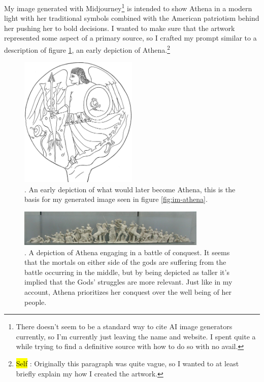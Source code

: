 \documentclass[letterpaper, reqno,11pt]{article}
\newcommand{\hlc}[2][yellow]{{%
    \colorlet{foo}{#1}%
    \sethlcolor{foo}\hl{#2}}%
}
\begin{document}
My image generated with Midjourney\autocite{midjourney}\footnote{There doesn't seem to be a standard way to cite AI image generators currently, so I'm currently just leaving the name and website. I spent quite a while trying to find a definitive source with how to do so with no avail. } is intended to show Athena in a modern light with her traditional symbols combined with the American patriotism behind her pushing her to bold decisions. I wanted to make sure that the artwork represented some aspect of a primary source, so I crafted my prompt similar to a description of figure \ref{fig:minerva}\autocite{minerva}, an early depiction of Athena.\footnote{\hlc[pink]{Self}: Originally this paragraph was quite vague, so I wanted to at least briefly explain my how I created the artwork.}

\begin{figure}[htpb]
  \centering
  \includegraphics[width=0.5\textwidth]{minerva}
  \caption{\cite{minerva}. An early depiction of what would later become Athena, this is the basis for my generated image seen in figure \ref{fig:im-athena}.}
  \label{fig:minerva}
\end{figure}

\begin{figure}[htpb]
    \centering
    \includegraphics[width=0.8\textwidth]{athena}
    \caption{\cite{poseidon}. A depiction of Athena engaging in a battle of conquest. It seems that the mortals on either side of the gods are suffering from the battle occurring in the middle, but by being depicted as taller it's implied that the Gods' struggles are more relevant. Just like in my account, Athena prioritizes her conquest over the well being of her people.}
    \label{fig:athena}
\end{figure}
\end{document}
